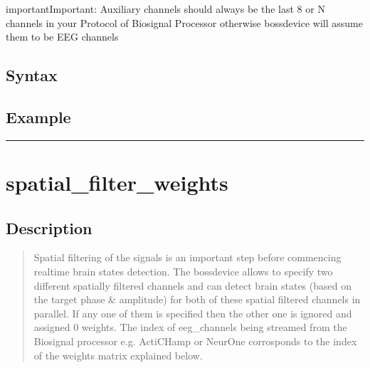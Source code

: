 \documentclass[letterpaper,10pt,english]{sphinxmanual}
\begin{document}
\begin{sphinxadmonition}{important}{Important:}
\sphinxAtStartPar
Auxiliary channels should always be the last 8 or N channels in your Protocol of Biosignal Processor otherwise bossdevice will assume them to be EEG channels
\end{sphinxadmonition}


\subsection{Syntax}
\label{\detokenize{4_api_documentation:id17}}
\begin{sphinxVerbatim}[commandchars=\\\{\}]
\PYG{p}{[}\PYG{p}{]}
\end{sphinxVerbatim}


\subsection{Example}
\label{\detokenize{4_api_documentation:id18}}
\begin{sphinxVerbatim}[commandchars=\\\{\}]
\end{sphinxVerbatim}


\bigskip\hrule\bigskip



\section{spatial\_filter\_weights}
\label{\detokenize{4_api_documentation:spatial-filter-weights}}

\subsection{Description}
\label{\detokenize{4_api_documentation:id19}}\begin{quote}

\sphinxAtStartPar
Spatial filtering of the signals is an important step before commencing real\sphinxhyphen{}time brain states detection. The bossdevice allows to specify two different spatially filtered channels and can detect brain states (based on the target phase \& amplitude) for both of these spatial filtered channels in parallel. If any one of them is specified then the other one is ignored and assigned 0 weights. The index of eeg\_channels being streamed from the Biosignal processor e.g. ActiCHamp or NeurOne corrosponds to the index of the weights matrix explained below.
\end{quote}
\end{document}
